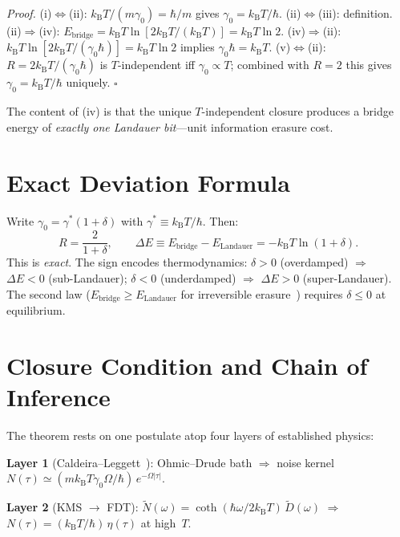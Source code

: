 \documentclass[twocolumn,showpacs,preprintnumbers,amsmath,amssymb]{revtex4-2}
\newcommand{\kB}{k_{\mathrm{B}}}
\newcommand{\Ebr}{E_{\mathrm{bridge}}}
\newcommand{\EL}{E_{\mathrm{Landauer}}}
\begin{document}
\noindent\textit{Proof.}
(i)$\Leftrightarrow$(ii):
$\kB T/(m\gamma_0) = \hbar/m$ gives $\gamma_0 = \kB T/\hbar$.
(ii)$\Leftrightarrow$(iii): definition.
(ii)$\Rightarrow$(iv):
$\Ebr = \kB T\ln[2\kB T/(\kB T)] = \kB T\ln 2$.
(iv)$\Rightarrow$(ii):
$\kB T\ln[2\kB T/(\gamma_0\hbar)] = \kB T\ln 2$
implies $\gamma_0\hbar = \kB T$.
(v)$\Leftrightarrow$(ii):
$R = 2\kB T/(\gamma_0\hbar)$ is $T$-independent iff
$\gamma_0 \propto T$; combined with $R = 2$ this gives
$\gamma_0 = \kB T/\hbar$ uniquely. \hfill$\square$

\medskip
\noindent The content of (iv) is that the unique
$T$-independent closure produces a bridge energy of
\emph{exactly one Landauer bit}---unit information
erasure cost.

\section{Exact Deviation Formula}

Write $\gamma_0 = \gamma^*(1+\delta)$ with
$\gamma^* \equiv \kB T/\hbar$.  Then:
\begin{equation}
  R = \frac{2}{1+\delta},\qquad
  \Delta E \equiv \Ebr - \EL = -\kB T\ln(1+\delta).
  \label{eq:dev}
\end{equation}
This is \emph{exact}.  The sign encodes thermodynamics:
$\delta > 0$ (overdamped) $\Rightarrow$ $\Delta E < 0$
(sub-Landauer);
$\delta < 0$ (underdamped) $\Rightarrow$ $\Delta E > 0$
(super-Landauer).
The second law ($\Ebr \geq \EL$ for irreversible
erasure~\cite{Landauer1961,Bennett1982}) requires
$\delta \leq 0$ at equilibrium.

\section{Closure Condition and Chain of Inference}

The theorem rests on one postulate atop four layers of
established physics:

\smallskip
\noindent\textbf{Layer 1} (Caldeira--Leggett~\cite{CaldeiraLeggett1983}):
Ohmic--Drude bath $\Rightarrow$ noise kernel
$N(\tau) \simeq (m\kB T\gamma_0\Omega/\hbar)\,e^{-\Omega|\tau|}$.

\noindent\textbf{Layer 2} (KMS $\to$ FDT):
$\tilde{N}(\omega) = \coth(\hbar\omega/2\kB T)\,\tilde{D}(\omega)$
$\Rightarrow$ $N(\tau) = (\kB T/\hbar)\,\eta(\tau)$ at high~$T$.
\end{document}
